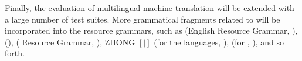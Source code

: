 Finally, the evaluation of multilingual machine translation will be
extended with a large number of test suites. More grammatical
fragments related to  will be incorporated into the
 resource grammars, such as  (English Resource
Grammar, \citealt{flickinger:00}), 
(\citealt{siegel:bender:02}),  
( Resource Grammar, \citealt{kim:etal:11}), ZHONG
\ensuremath{[\big|]} (for the  languages, \citealt{fan:15a,fan:15b}),
 (for , \citealt{moeljadi:15}), and so forth.

